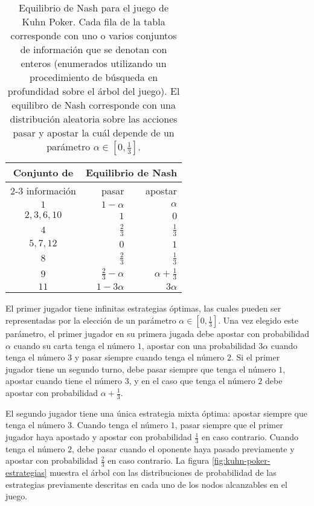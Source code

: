 \begin{table}[h]
\begin{center}
    \caption{Equilibrio de Nash para el juego de Kuhn Poker. Cada fila de la tabla corresponde con uno o varios conjuntos de información que se denotan con enteros (enumerados utilizando un procedimiento de búsqueda en profundidad sobre el árbol del juego). El equilibro de Nash corresponde con una distribución aleatoria sobre las acciones pasar y apostar la cuál depende de un parámetro $\alpha \in \left[ 0,\frac{1}{3} \right]$.}
    \label{tab:estrategia-kuhn-poker}
    \begin{tabular}{c r r}
        \toprule
        \multirow{2}{*}{Conjunto de} & \multicolumn{2}{c}{Equilibrio de Nash}  \\ \cmidrule(l){2-3}
        información & pasar & apostar \\ 
        \midrule
         $1$ & $1-\alpha$ & $\alpha$ \\
         $2, 3, 6, 10$ & $1$ & $0$ \\
         $4$ & $\frac{2}{3}$ & $\frac{1}{3}$ \\
         $5, 7, 12$ & $0$ & $1$ \\
         $8$ & $\frac{2}{3}$ & $\frac{1}{3}$ \\
         $9$ & $\frac{2}{3} - \alpha$ & $\alpha + \frac{1}{3}$ \\
        $11$ & $1 - 3 \alpha$ & $3 \alpha$ \\ \bottomrule
    \end{tabular}
\end{center}
\end{table}

El primer jugador tiene infinitas estrategias óptimas, las cuales pueden ser representadas por la elección de un parámetro $\alpha \in \left[ 0, \frac{1}{3} \right]$. Una vez elegido este parámetro, el primer jugador en su primera jugada debe apostar con probabilidad $\alpha$ cuando su carta tenga el número $1$, apostar con una probabilidad $3 \alpha$ cuando tenga el número $3$ y pasar siempre cuando tenga el número $2$. Si el primer jugador tiene un segundo turno, debe pasar siempre que tenga el número $1$, apostar cuando tiene el número $3$, y en el caso que tenga el número $2$ debe apostar con probabilidad $\alpha + \frac{1}{3}$.

El segundo jugador tiene una única estrategia mixta óptima: apostar siempre que tenga el número $3$. Cuando tenga el número $1$, pasar siempre que el primer jugador haya apostado y apostar con probabilidad $\frac{1}{3}$ en caso contrario. Cuando tenga el número $2$, debe pasar cuando el oponente haya pasado previamente y apostar con probabilidad $\frac{2}{3}$ en caso contrario. La figura \ref{fig:kuhn-poker-estrategias} muestra el árbol con las distribuciones de probabilidad de las estrategias previamente descritas en cada uno de los nodos alcanzables en el juego.

